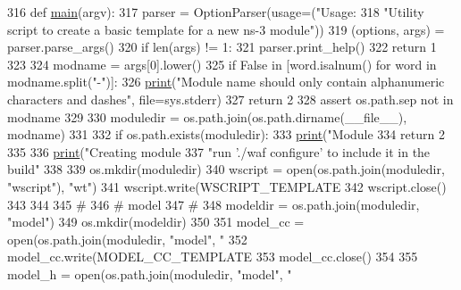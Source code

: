 \begin{DoxyCode}
316 \textcolor{keyword}{def }\hyperlink{namespacecreate-module_a293e91dd0a44f4845da45a092e947974}{main}(argv):
317     parser = OptionParser(usage=(\textcolor{stringliteral}{"Usage: %
318                                  \textcolor{stringliteral}{"Utility script to create a basic template for a new ns-3 module"}))
319     (options, args) = parser.parse\_args()
320     \textcolor{keywordflow}{if} len(args) != 1:
321         parser.print\_help()
322         \textcolor{keywordflow}{return} 1
323 
324     modname = args[0].lower()
325     \textcolor{keywordflow}{if} \textcolor{keyword}{False} \textcolor{keywordflow}{in} [word.isalnum() \textcolor{keywordflow}{for} word \textcolor{keywordflow}{in} modname.split(\textcolor{stringliteral}{"-"})]:
326         \hyperlink{lte__link__budget_8m_adeb58160e8a06243630c5f01e1808e15}{print}(\textcolor{stringliteral}{"Module name should only contain alphanumeric characters and dashes"}, file=sys.stderr)
327         \textcolor{keywordflow}{return} 2
328     \textcolor{keyword}{assert} os.path.sep \textcolor{keywordflow}{not} \textcolor{keywordflow}{in} modname
329 
330     moduledir = os.path.join(os.path.dirname(\_\_file\_\_), modname)
331 
332     \textcolor{keywordflow}{if} os.path.exists(moduledir):
333         \hyperlink{lte__link__budget_8m_adeb58160e8a06243630c5f01e1808e15}{print}(\textcolor{stringliteral}{"Module %
334         \textcolor{keywordflow}{return} 2
335 
336     \hyperlink{lte__link__budget_8m_adeb58160e8a06243630c5f01e1808e15}{print}(\textcolor{stringliteral}{"Creating module %
337           \textcolor{stringliteral}{"run './waf configure' to include it in the build"} %
338 
339     os.mkdir(moduledir)
340     wscript = open(os.path.join(moduledir, \textcolor{stringliteral}{"wscript"}), \textcolor{stringliteral}{"wt"})
341     wscript.write(WSCRIPT\_TEMPLATE %
342     wscript.close()
343 
344 
345     \textcolor{comment}{#}
346     \textcolor{comment}{# model}
347     \textcolor{comment}{# }
348     modeldir = os.path.join(moduledir, \textcolor{stringliteral}{"model"})
349     os.mkdir(modeldir)
350 
351     model\_cc = open(os.path.join(moduledir, \textcolor{stringliteral}{"model"}, \textcolor{stringliteral}{"%
352     model\_cc.write(MODEL\_CC\_TEMPLATE %
353     model\_cc.close()
354 
355     model\_h = open(os.path.join(moduledir, \textcolor{stringliteral}{"model"}, \textcolor{stringliteral}{"%
}}}}}
\end{DoxyCode}
